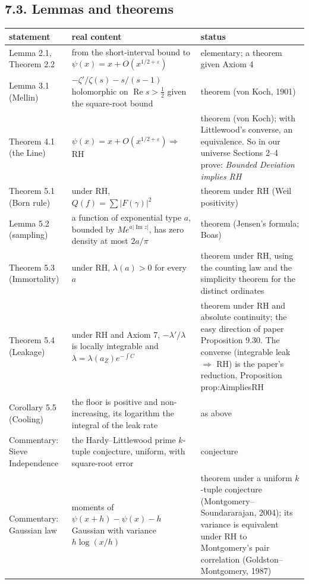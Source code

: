 \documentclass[11pt]{article}
\theoremstyle{definition}
\theoremstyle{remark}
\newcommand{\Ree}{\operatorname{Re}}
\newcommand{\Imm}{\operatorname{Im}}
\newcommand{\ps}{\psi}
\begin{document}
\subsection*{7.3. Lemmas and theorems}

\begin{center}\small
\begin{tabular}{@{}p{3.6cm}p{6.2cm}p{5.4cm}@{}}
\toprule
statement & real content & status\\
\midrule
Lemma 2.1, Theorem 2.2 & from the short-interval bound to $\ps(x)=x+O(x^{1/2+\varepsilon})$ & elementary; a theorem given Axiom 4\\
Lemma 3.1 (Mellin) & $-\zeta'/\zeta(s)-s/(s-1)$ holomorphic on $\Ree s>\tfrac12$ given the square-root bound & theorem (von Koch, 1901)\\
Theorem 4.1 (the Line) & $\ps(x)=x+O(x^{1/2+\varepsilon})\Rightarrow$ RH & theorem (von Koch); with Littlewood's converse, an equivalence. So in our universe Sections 2--4 prove: \emph{Bounded Deviation implies RH}\\
Theorem 5.1 (Born rule) & under RH, $Q(f)=\sum|F(\gamma)|^2$ & theorem under RH (Weil positivity)\\
Lemma 5.2 (sampling) & a function of exponential type $a$, bounded by $Me^{a|\Imm z|}$, has zero density at most $2a/\pi$ & theorem (Jensen's formula; Boas)\\
Theorem 5.3 (Immortality) & under RH, $\lambda(a)>0$ for every $a$ & theorem under RH, using the counting law and the simplicity theorem for the distinct ordinates\\
Theorem 5.4 (Leakage) & under RH and Axiom 7, $-\lambda'/\lambda$ is locally integrable and $\lambda=\lambda(a_Z)e^{-\int C}$ & theorem under RH and absolute continuity; the easy direction of paper Proposition 9.30. The converse (integrable leak $\Rightarrow$ RH) is the paper's reduction, Proposition prop:AimpliesRH\\
Corollary 5.5 (Cooling) & the floor is positive and non-increasing, its logarithm the integral of the leak rate & as above\\
Commentary: Sieve Independence & the Hardy--Littlewood prime $k$-tuple conjecture, uniform, with square-root error & conjecture\\
Commentary: Gaussian law & moments of $\ps(x+h)-\ps(x)-h$ Gaussian with variance $h\log(x/h)$ & theorem under a uniform $k$-tuple conjecture (Montgomery--Soundararajan, 2004); its variance is equivalent under RH to Montgomery's pair correlation (Goldston--Montgomery, 1987)\\
\bottomrule
\end{tabular}
\end{center}
\end{document}
